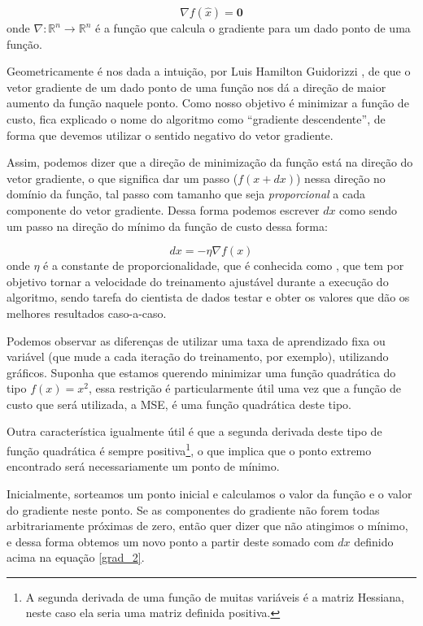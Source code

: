 \begin{equation}\label{grad_1}
\nabla f(\hat{x}) = \mathbf{0}
\end{equation}
onde $\nabla{:}\mathbb{R}^n \rightarrow \mathbb{R}^n$ é a função que calcula o gradiente para um dado ponto de uma função.

Geometricamente é nos dada a intuição, por Luis Hamilton Guidorizzi \citep{guidorizzi2}, de que o vetor gradiente de um dado ponto de uma função nos dá a direção de maior aumento da função naquele ponto. Como nosso objetivo é minimizar a função de custo, fica explicado o nome do algoritmo como ``gradiente descendente'', de forma que devemos utilizar o sentido negativo do vetor gradiente.

Assim, podemos dizer que a direção de minimização da função está na direção do vetor gradiente, o que significa dar um passo ($f(x + dx)$) nessa direção no domínio da função, tal passo com tamanho que seja \emph{proporcional} a cada componente do vetor gradiente. Dessa forma podemos escrever $dx$ como sendo um passo na direção do mínimo da função de custo dessa forma:

\begin{equation}\label{grad_2}
dx = - \eta \nabla f(x)
\end{equation}
onde $\eta$ é a constante de proporcionalidade, que é conhecida como , que tem por objetivo tornar a velocidade do treinamento ajustável durante a execução do algoritmo, sendo tarefa do cientista de dados testar e obter os valores que dão os melhores resultados caso-a-caso. 

Podemos observar as diferenças de utilizar uma taxa de aprendizado fixa ou variável (que mude a cada iteração do treinamento, por exemplo), utilizando gráficos. Suponha que estamos querendo minimizar uma função quadrática do tipo $f(x) = x^2$, essa restrição é particularmente útil uma vez que a função de custo que será utilizada, a MSE, é uma função quadrática deste tipo. 

Outra característica igualmente útil é que a segunda derivada deste tipo de função quadrática é sempre positiva\footnote{A segunda derivada de uma função de muitas variáveis é a matriz Hessiana, neste caso ela seria uma matriz definida positiva.}, o que implica que o ponto extremo encontrado será necessariamente um ponto de mínimo.

Inicialmente, sorteamos um ponto inicial e calculamos o valor da função e o valor do gradiente neste ponto. Se as componentes do gradiente não forem todas arbitrariamente próximas de zero, então quer dizer que não atingimos o mínimo, e dessa forma obtemos um novo ponto a partir deste somado com $dx$ definido acima na equação \ref{grad_2}. 

